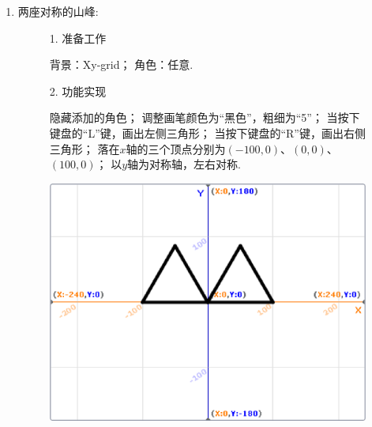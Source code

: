 \documentclass[10pt, a4paper]{article}
\begin{document}
\begin{enumerate}
        \item 两座对称的山峰:
        \begin{figure}[htbp]
            \begin{minipage}{.6\textwidth}
                1. 准备工作
                \begin{tasks}[label = (\arabic*)]
                    \task 背景：Xy-grid；
                    \task 角色：任意.
                \end{tasks}
                2. 功能实现
                \begin{tasks}[label = (\arabic*)]
                    \task 隐藏添加的角色；
                    \task 调整画笔颜色为“黑色”，粗细为“5”；
                    \task 当按下键盘的“L”键，画出左侧三角形；
                    \task 当按下键盘的“R”键，画出右侧三角形；
                    \task 落在$x$轴的三个顶点分别为$(-100,0)$、$(0,0)$、$(100,0)$；
                    \task 以$y$轴为对称轴，左右对称.
                \end{tasks}
            \end{minipage}
            \begin{minipage}{.37\textwidth}
                \centering
                \includegraphics[width=\textwidth]{37.png}
            \end{minipage}
        \end{figure}
    \end{enumerate}
\end{document}
